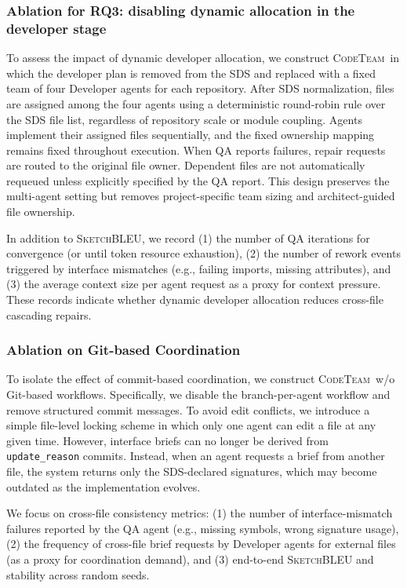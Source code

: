 \documentclass[format=acmsmall, review=false, screen=true]{acmart}
\newcommand{\tool}{\textsc{CodeTeam}\xspace}
\newcommand{\sketchbleu}{\textsc{SketchBLEU}\xspace}
\begin{document}
\subsubsection{Ablation for RQ3: disabling dynamic allocation in the developer stage}\label{subsubsec:ablation-dynalloc}
To assess the impact of dynamic developer allocation, we construct \tool\ in which the developer plan is removed from the SDS and replaced with a fixed team of four Developer agents for each repository. After SDS normalization, files are assigned among the four agents using a deterministic round-robin rule over the SDS file list, regardless of repository scale or module coupling. Agents implement their assigned files sequentially, and the fixed ownership mapping remains fixed throughout execution. When QA reports failures, repair requests are routed to the original file owner. Dependent files are not automatically requeued unless explicitly specified by the QA report. This design preserves the multi-agent setting but removes project-specific team sizing and architect-guided file ownership.

In addition to \sketchbleu, we record (1) the number of QA iterations for convergence (or until token resource exhaustion), (2) the number of rework events triggered by interface mismatches (e.g., failing imports, missing attributes), and (3) the average context size per agent request as a proxy for context pressure. These records indicate whether dynamic developer allocation reduces cross-file cascading repairs.

\subsubsection{Ablation on Git-based Coordination} \label{subsubsec:ablation-git}
To isolate the effect of commit-based coordination, we construct \tool\ w/o Git-based workflows. Specifically, we disable the branch-per-agent workflow and remove structured commit messages. To avoid edit conflicts, we introduce a simple file-level locking scheme in which only one agent can edit a file at any given time. However, interface briefs can no longer be derived from \texttt{update\_reason} commits.
Instead, when an agent requests a brief from another file, the system returns only the SDS-declared signatures, which may become outdated as the implementation evolves.

We focus on cross-file consistency metrics: (1) the number of interface-mismatch failures reported by the QA agent (e.g., missing symbols, wrong signature usage), (2) the frequency of cross-file brief requests by Developer agents for external files (as a proxy for coordination demand), and (3) end-to-end \sketchbleu and stability across random seeds.
\end{document}

